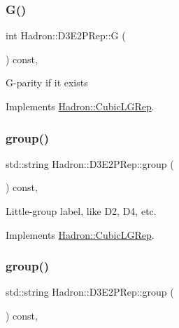 \subsubsection{\texorpdfstring{G()}{G()}\hspace{0.1cm}{\footnotesize\ttfamily [2/2]}}
{\footnotesize\ttfamily int Hadron\+::\+D3\+E2\+P\+Rep\+::G (\begin{DoxyParamCaption}{ }\end{DoxyParamCaption}) const\hspace{0.3cm}{\ttfamily [inline]}, {\ttfamily [virtual]}}

G-\/parity if it exists 

Implements \mbox{\hyperlink{structHadron_1_1CubicLGRep_ace26f7b2d55e3a668a14cb9026da5231}{Hadron\+::\+Cubic\+L\+G\+Rep}}.

\mbox{\label{structHadron_1_1D3E2PRep_aa62b1082d728526868a2269ac65e75aa}} 
\subsubsection{\texorpdfstring{group()}{group()}\hspace{0.1cm}{\footnotesize\ttfamily [1/2]}}
{\footnotesize\ttfamily std\+::string Hadron\+::\+D3\+E2\+P\+Rep\+::group (\begin{DoxyParamCaption}{ }\end{DoxyParamCaption}) const\hspace{0.3cm}{\ttfamily [inline]}, {\ttfamily [virtual]}}

Little-\/group label, like D2, D4, etc. 

Implements \mbox{\hyperlink{structHadron_1_1CubicLGRep_a9bdb14b519a611d21379ed96a3a9eb41}{Hadron\+::\+Cubic\+L\+G\+Rep}}.

\mbox{\label{structHadron_1_1D3E2PRep_aa62b1082d728526868a2269ac65e75aa}} 
\subsubsection{\texorpdfstring{group()}{group()}\hspace{0.1cm}{\footnotesize\ttfamily [2/2]}}
{\footnotesize\ttfamily std\+::string Hadron\+::\+D3\+E2\+P\+Rep\+::group (\begin{DoxyParamCaption}{ }\end{DoxyParamCaption}) const\hspace{0.3cm}{\ttfamily [inline]}, {\ttfamily [virtual]}}

